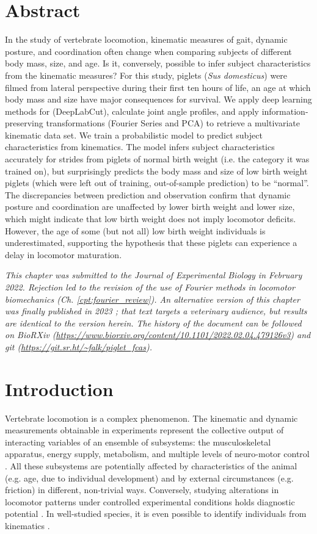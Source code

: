 \clearpage
\section{Abstract}
\label{abstract_22}
In the study of vertebrate locomotion, kinematic measures of gait, dynamic posture, and coordination often change when comparing subjects of different body mass, size, and age.
Is it, conversely, possible to infer subject characteristics from the kinematic measures?
For this study, piglets (\textit{Sus domesticus}) were filmed from lateral perspective during their first ten hours of life, an age at which body mass and size have major consequences for survival.
We apply deep learning methods for  (DeepLabCut), calculate joint angle profiles, and apply information-preserving transformations (Fourier Series and PCA) to retrieve a multivariate kinematic data set.
We train a probabilistic model to predict subject characteristics from kinematics.
The model infers subject characteristics accurately for strides from piglets of normal birth weight (i.e. the category it was trained on), but surprisingly predicts the body mass and size of low birth weight piglets (which were left out of training, out-of-sample prediction) to be ``normal''.
The discrepancies between prediction and observation confirm that dynamic posture and coordination are unaffected by lower birth weight and lower size, which might indicate that low birth weight does not imply locomotor deficits.
However, the age of some (but not all) low birth weight individuals is underestimated, supporting the hypothesis that these piglets can experience a delay in locomotor maturation.

\textit{This chapter was submitted to the Journal of Experimental Biology in February 2022. Rejection led to the revision of the use of Fourier methods in locomotor biomechanics (Ch. \ref{cpt:fourier_review}). An alternative version of this chapter was finally published in 2023 \citep{Mielke2023}; that text targets a veterinary audience, but results are identical to the version herein. The history of the document can be followed on BioRXiv (\url{https://www.biorxiv.org/content/10.1101/2022.02.04.479126v3}) and git (\url{https://git.sr.ht/~falk/piglet_fcas}). }


\FloatBarrier
\clearpage
\section{Introduction}
\label{intro_22}
Vertebrate locomotion is a complex phenomenon.
The kinematic and dynamic measurements obtainable in experiments represent the collective output of interacting variables of an ensemble of subsystems:
the musculoskeletal apparatus, energy supply, metabolism, and multiple levels of neuro-motor control \citep{Nishikawa2007}.
All these subsystems are potentially affected by characteristics of the animal (e.g. age, due to individual development) and by external circumstances (e.g. friction) in different, non-trivial ways.
Conversely, studying alterations in locomotor patterns under controlled experimental conditions holds diagnostic potential \citep[e.g.][]{Figueiredo2018}.
In well-studied species, it is even possible to identify individuals from kinematics \citep[e.g.][]{Patua2021}.


